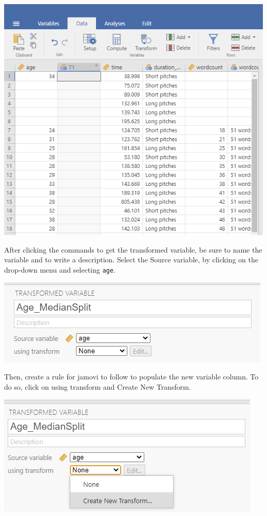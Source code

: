\documentclass[
]{book}
\begin{document}
\includegraphics{img/InsertTransformedVariableToLeft.png}

After clicking the commands to get the transformed variable, be sure to name the variable and to write a description. Select the {Source variable}, by clicking on the drop-down menu and selecting \texttt{age}.

\includegraphics{img/TransformingAgeVariable1.png}

Then, create a rule for jamovi to follow to populate the new variable column. To do so, click on {using transform} and {Create New Transform}.

\includegraphics{img/TransformingAgeVariable2.png}
\end{document}
